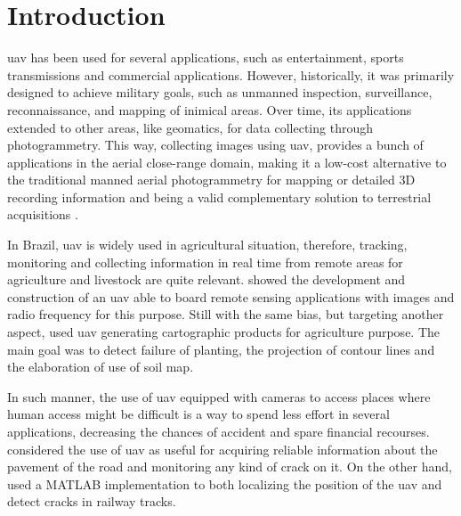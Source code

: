 \chapter[Introduction]{Introduction}\label{cha:intro}

\gls*{uav} has been used for several applications, such as entertainment, sports transmissions and commercial applications.
However, historically, it was primarily designed to achieve military goals, such as unmanned inspection, surveillance, reconnaissance, and mapping of inimical areas.
Over time, its applications extended to other areas, like geomatics, for data collecting through photogrammetry. 
This way, collecting images using \gls*{uav}, provides a bunch of applications in the aerial close-range domain, making it a low-cost alternative to the traditional manned aerial photogrammetry for mapping or detailed 3D recording information and being a valid complementary solution to terrestrial acquisitions \cite{nex2014uav}.

In Brazil, \gls*{uav} is widely used in agricultural situation, therefore, tracking, monitoring and collecting information in real time from remote areas for agriculture and livestock are quite relevant. 
\textcite{abade2016construccao} showed the development and construction of an \gls*{uav} able to board remote sensing applications with images and radio frequency for this purpose. 
Still with the same bias, but targeting another aspect, \textcite{otake2017produtos} used \gls*{uav} generating cartographic products for agriculture purpose. 
The main goal was to detect failure of planting, the projection of contour lines and the elaboration of use of soil map.

In such manner, the use of \gls*{uav} equipped with cameras to access places where human access might be difficult is a way to spend less effort in several applications, decreasing the chances of accident and spare financial recourses.
\textcite{dadrasjavan2019automatic} considered the use of \gls*{uav} as useful for acquiring reliable information about the pavement of the road and monitoring any kind of crack on it. On the other hand, \textcite{sushant2017localization} used a MATLAB\textsuperscript{\textregistered}
implementation to both localizing the position of the \gls*{uav} and detect cracks in railway tracks.

